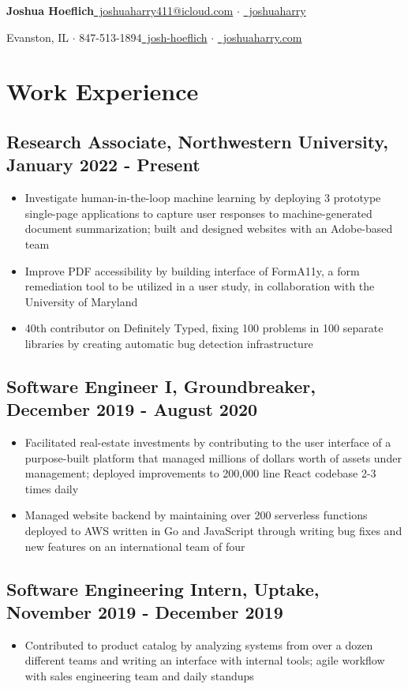 \documentclass[letterpaper]{article}
\newcommand{\bigdot}{{\large $\cdot$ }}
\begin{document}
{\Large \textbf{Joshua Hoeflich}}\hfill \href{mailto:joshuahoeflich2021@u.northwestern.edu}{{\small \faEnvelope}~joshuaharry411@icloud.com} \bigdot
\href{https://github.com/joshuaharry}{{\small \faGithub}~joshuaharry}

{\normalsize Evanston, IL $\cdot$ 847-513-1894}\hfill \href{https://www.linkedin.com/in/josh-hoeflich/}{{\small \faLinkedinSquare}~josh-hoeflich} $\cdot$ \href{https://joshuaharry.com}{{\small \faGlobe}~joshuaharry.com}
\section*{Work Experience}
\subsection*{Research Associate, Northwestern University, January 2022 - Present}
\begin{itemize}
\item Investigate human-in-the-loop machine learning by deploying 3 prototype single-page applications to capture user responses to machine-generated document summarization; built and designed websites with an Adobe-based team
\item Improve PDF accessibility by building interface of FormA11y, a form remediation tool to be utilized in a user study, in collaboration with the University of Maryland
\item 40th contributor on Definitely Typed, fixing 100 problems in 100 separate libraries by creating automatic bug detection infrastructure
\end{itemize}
\subsection*{Software Engineer I, Groundbreaker, December 2019 - August 2020}
\begin{itemize}
\item Facilitated real-estate investments by contributing to the user interface of a purpose-built platform that managed millions of dollars worth of assets under management; deployed improvements to 200,000 line React codebase 2-3 times daily

\item Managed website backend by maintaining over 200 serverless functions deployed to AWS written in Go and JavaScript through writing bug fixes and new features on an international team of four
\end{itemize}
\subsection*{Software Engineering Intern, Uptake, November 2019 - December 2019}
\begin{itemize}
  \item Contributed to product catalog by analyzing systems from over a dozen different teams and writing an interface with internal tools; agile workflow with sales engineering team and daily standups
\end{itemize}
\end{document}
